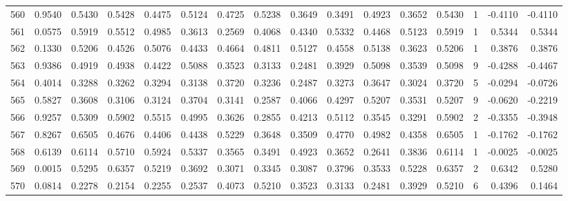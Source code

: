 \begin{tabular}{lrrrrrrrrrrrrrrr}
560 &      0.9540 &  0.5430 &  0.5428 &  0.4475 &  0.5124 &  0.4725 &  0.5238 &  0.3649 &  0.3491 &  0.4923 &   0.3652 &     0.5430 &      1 &                   -0.4110 &                    -0.4110 \\
561 &      0.0575 &  0.5919 &  0.5512 &  0.4985 &  0.3613 &  0.2569 &  0.4068 &  0.4340 &  0.5332 &  0.4468 &   0.5123 &     0.5919 &      1 &                    0.5344 &                     0.5344 \\
562 &      0.1330 &  0.5206 &  0.4526 &  0.5076 &  0.4433 &  0.4664 &  0.4811 &  0.5127 &  0.4558 &  0.5138 &   0.3623 &     0.5206 &      1 &                    0.3876 &                     0.3876 \\
563 &      0.9386 &  0.4919 &  0.4938 &  0.4422 &  0.5088 &  0.3523 &  0.3133 &  0.2481 &  0.3929 &  0.5098 &   0.3539 &     0.5098 &      9 &                   -0.4288 &                    -0.4467 \\
564 &      0.4014 &  0.3288 &  0.3262 &  0.3294 &  0.3138 &  0.3720 &  0.3236 &  0.2487 &  0.3273 &  0.3647 &   0.3024 &     0.3720 &      5 &                   -0.0294 &                    -0.0726 \\
565 &      0.5827 &  0.3608 &  0.3106 &  0.3124 &  0.3704 &  0.3141 &  0.2587 &  0.4066 &  0.4297 &  0.5207 &   0.3531 &     0.5207 &      9 &                   -0.0620 &                    -0.2219 \\
566 &      0.9257 &  0.5309 &  0.5902 &  0.5515 &  0.4995 &  0.3626 &  0.2855 &  0.4213 &  0.5112 &  0.3545 &   0.3291 &     0.5902 &      2 &                   -0.3355 &                    -0.3948 \\
567 &      0.8267 &  0.6505 &  0.4676 &  0.4406 &  0.4438 &  0.5229 &  0.3648 &  0.3509 &  0.4770 &  0.4982 &   0.4358 &     0.6505 &      1 &                   -0.1762 &                    -0.1762 \\
568 &      0.6139 &  0.6114 &  0.5710 &  0.5924 &  0.5337 &  0.3565 &  0.3491 &  0.4923 &  0.3652 &  0.2641 &   0.3836 &     0.6114 &      1 &                   -0.0025 &                    -0.0025 \\
569 &      0.0015 &  0.5295 &  0.6357 &  0.5219 &  0.3692 &  0.3071 &  0.3345 &  0.3087 &  0.3796 &  0.3533 &   0.5228 &     0.6357 &      2 &                    0.6342 &                     0.5280 \\
570 &      0.0814 &  0.2278 &  0.2154 &  0.2255 &  0.2537 &  0.4073 &  0.5210 &  0.3523 &  0.3133 &  0.2481 &   0.3929 &     0.5210 &      6 &                    0.4396 &                     0.1464 \\

\end{tabular}
